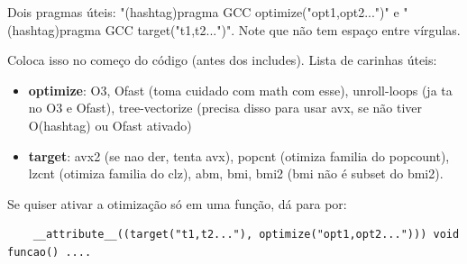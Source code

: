 Dois pragmas úteis: "(hashtag)pragma GCC optimize("opt1,opt2...")" e "(hashtag)pragma GCC target("t1,t2...")".
Note que não tem espaço entre vírgulas.

Coloca isso no começo do código (antes dos includes). Lista de carinhas úteis:

\begin{itemize}
    \item \textbf{optimize}: O3, Ofast (toma cuidado com math com esse), unroll-loops (ja ta no O3 e Ofast), 
    tree-vectorize (precisa disso para usar avx, se não tiver O(hashtag) ou Ofast ativado)
    \item \textbf{target}: avx2 (se nao der, tenta avx), popcnt (otimiza familia do popcount), 
    lzcnt (otimiza familia do clz), abm, bmi, bmi2 (bmi não é subset do bmi2).
\end{itemize}

Se quiser ativar a otimização só em uma função, dá para por:
\begin{verbatim}
    __attribute__((target("t1,t2..."), optimize("opt1,opt2..."))) void funcao() ....
    \end{verbatim}